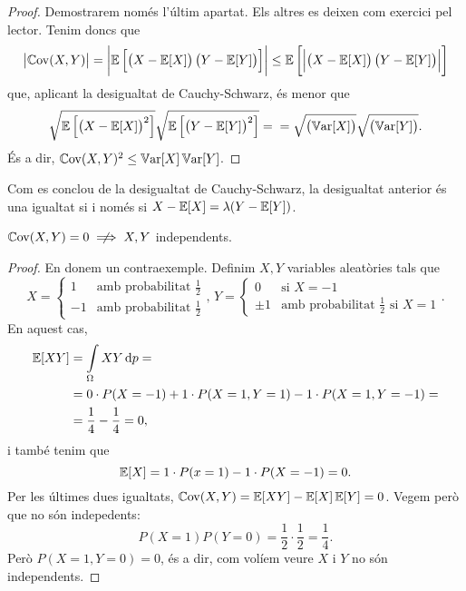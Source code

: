 \begin{proof}
    Demostrarem nom\'es l'últim apartat. Els altres es deixen com exercici pel lector.
    Tenim doncs que
    \[
        \left|\operatorname{\mathbb{C}ov}(X, Y)\right| = 
        \left|\operatorname{\mathbb{E}}\left[\left( X - \operatorname{\mathbb{E}}[X] \right) \left( Y- \operatorname{\mathbb{E}}[Y]\right)\right]\right| 
        \leq \operatorname{\mathbb{E}}\left[\left|\left( X - \operatorname{\mathbb{E}}[X] \right) \left( Y- \operatorname{\mathbb{E}}[Y]\right)\right|\right]
    \]
    que, aplicant la desigualtat de Cauchy-Schwarz, \'es menor que
    \[
        \sqrt{\operatorname{\mathbb{E}} \left[ \left( X - \operatorname{\mathbb{E}}[X] \right)^2\right]} 
        \sqrt{\operatorname{\mathbb{E}} \left[ \left( Y - \operatorname{\mathbb{E}}[Y] \right)^2\right]} = \\
        = \sqrt{\left(\operatorname{\mathbb{V}ar}[X]\right)} \sqrt{\left( \operatorname{\mathbb{V}ar}[Y] \right)}.
    \]
    \'Es a dir, $\operatorname{\mathbb{C}ov}(X, Y)^2 \leq \operatorname{\mathbb{V}ar}[X] \operatorname{\mathbb{V}ar}[Y]$.
\end{proof}

\begin{obs}
    Com es conclou de la desigualtat de Cauchy-Schwarz, la desigualtat anterior \'es una
    igualtat si i nom\'es si $X - \operatorname{\mathbb{E}}[X] = \lambda (Y - \operatorname{\mathbb{E}}[Y])$.
\end{obs}

\begin{obs}
    $\cov(X, Y) = 0 \centernot \implies X,Y$ independents.
\end{obs}

\begin{proof}
    En donem un contraexemple. Definim $X, Y$ variables aleatòries tals que
    \[
        X = 
        \begin{cases}
            1 &\text{amb probabilitat } \frac{1}{2}\\
            -1 &\text{amb probabilitat } \frac{1}{2} 
        \end{cases}, \,
        Y =
        \begin{cases}
            0 &\text{si } X = -1 \\
            \pm 1 &\text{amb probabilitat } \frac{1}{2} \text{ si } X = 1
        \end{cases}.
    \]
    En aquest cas,
    \begin{align*}
        \esp[XY] &= \int\limits_{\Omega} XY \dif p = \\
        &= 0 \cdot P(X = -1) + 1 \cdot 
        P(X = 1, Y = 1) - 1 \cdot P(X= 1, Y= -1) = \\
        &= \frac{1}{4} - \frac{1}{4} = 0,
    \end{align*}
    i tamb\'e tenim que
    \[
        \operatorname{\mathbb{E}}[X] = 1\cdot P(x = 1) - 1 \cdot P(X = -1) = 0. 
    \]
    Per les últimes dues igualtats, $\operatorname{\mathbb{C}ov}(X, Y) = \operatorname{\mathbb{E}}[XY] - \operatorname{\mathbb{E}}[X]\operatorname{\mathbb{E}}[Y] = 0$. Vegem
    però que no són indepedents:
    \[
        P(X = 1)P(Y = 0) = \frac{1}{2} \cdot \frac{1}{2} = \frac{1}{4}.
    \]
    Però $P(X = 1, Y = 0) = 0$, \'es a dir, com volíem veure $X$ i $Y$ no són independents.
\end{proof}



